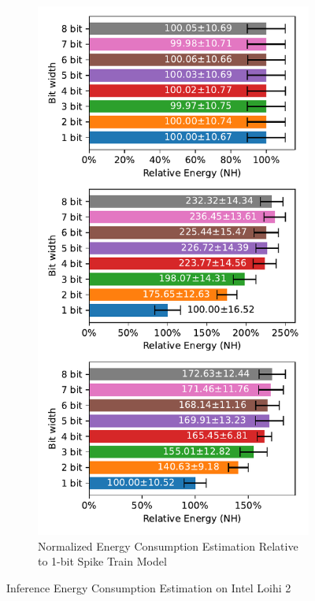         \begin{figure}[H]
            \centering
            \ContinuedFloat
            \begin{subfigure}[H]{0.7\textwidth}
                \centering
                \includegraphics[width=\textwidth]{../standard/FashionMNIST/plots/fashionmnist_test_relative_energy_nh.pdf}
                \caption{Normalized Energy Consumption Estimation Relative to 1-bit Spike Train Model}
            \end{subfigure}
            \caption{Inference Energy Consumption Estimation on Intel Loihi 2}
        \end{figure}
    
